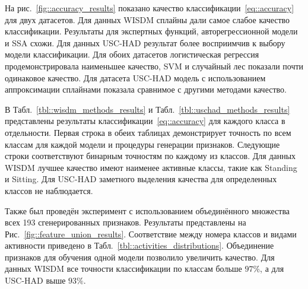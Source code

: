 На рис.~\ref{fig::accuracy_results} показано качество классификации~\eqref{eq::accuracy} для двух датасетов.
Для данных WISDM сплайны дали самое слабое качество классификации.
Результаты для экспертных функций, авторегрессионной модели и SSA схожи.
Для данных USC-HAD результат более восприимчив к выбору модели классификации. 
Для обоих датасетов логистическая регрессия продемонстрировала наименьшее качество, SVM и случайный лес показали почти одинаковое качество.
Для датасета USC-HAD модель с использованием аппроксимации сплайнами
показала сравнимое с другими методами качество. 

В Табл.~\ref{tbl::wisdm_methods_results} и Табл.~\ref{tbl::uschad_methods_results} представлены результаты классификации~\eqref{eq::accuracy} для каждого класса в отдельности.
Первая строка в обеих таблицах демонстрирует точность по всем классам для каждой модели и процедуры генерации признаков.
Следующие строки соответствуют бинарным точностям по каждому из классов.
Для данных WISDM лучшее качество имеют наименее активные классы, такие как Standing и Sitting. 
Для USC-HAD заметного выделения качества для определенных классов не наблюдается.

Также был проведён эксперимент с использованием объединённого множества всех 193 сгенерированных признаков.
Результаты представлены на Рис.~\ref{fig::feature_union_results}. Соответствие между номера классов и видами активности приведено в Табл.~\ref{tbl::activities_distributions}. 
Объединение признаков для обучения одной модели позволило увеличить качество. 
Для данных WISDM все точности классификации по классам больше $97 \%$, а для USC-HAD выше $93 \%$.

